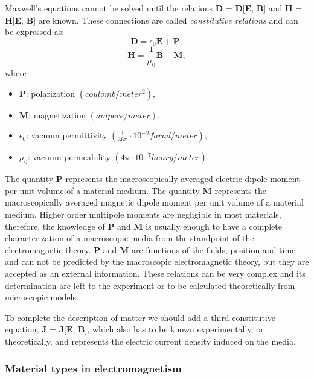 Maxwell's equations cannot be solved until the relations \textbf{D} = \textbf{D}[\textbf{E}, \textbf{B}] and \textbf{H} = \textbf{H}[\textbf{E}, \textbf{B}] are known. These connections are called \emph{constitutive relations} and can be expressed as:
\begin{equation}\label{ConstitutiveRelationDE}
	\mathbf{D} = \epsilon_{0}\mathbf{E} + \mathbf{P},
\end{equation}
\begin{equation}\label{ConstitutiveRelationBH}
	\mathbf{H} = \frac{1}{\mu_{0}}\mathbf{B} - \mathbf{M},
\end{equation}
where
\begin{itemize}
	\itemsep0em 
	\item[]\textbf{P}: polarization $\left(coulomb/meter^{2}\right)$,
	\item[]\textbf{M}: magnetization $\left(ampere/meter\right)$,
	\item[]$\epsilon_{0}$: vacuum permittivity $\left(\frac{1}{36\pi}\cdot10^{-9} farad/meter\right)$,
	\item[]$\mu_{0}$: vacuum permeability $\left(4\pi\cdot10^{-7} henry/meter\right)$.
\end{itemize}
The quantity \textbf{P} represents the macroscopically averaged electric dipole moment per unit volume of a material medium. The quantity \textbf{M} represents the macroscopically averaged magnetic dipole moment per unit volume of a material medium. Higher order multipole moments are negligible in most materials, therefore, the knowledge of \textbf{P} and \textbf{M} is usually enough to have a complete characterization of a macroscopic media from the standpoint of the electromagnetic theory. \textbf{P} and \textbf{M} are functions of the fields, position and time and can not be predicted by the macroscopic electromagnetic theory, but they are accepted as an external information. These relations can be very complex and its determination are left to the experiment or to be calculated theoretically from microscopic models.

To complete the description of matter we should add a third constitutive equation, \textbf{J} = \textbf{J}[\textbf{E}, \textbf{B}], which also has to be known experimentally, or theoretically, and represents the electric current density induced on the media.

\subsubsection{Material types in electromagnetism}\label{GConstitutiveRelations}

